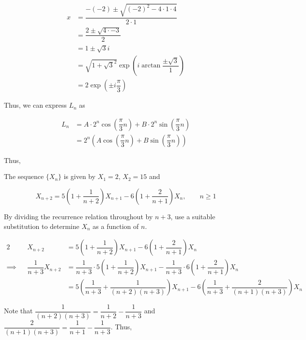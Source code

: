 \documentclass{jhwhw}
\begin{document}
        \begin{align*}
            x &= \dfrac{-(-2) \pm \sqrt{(-2)^2 - 4\cdot1\cdot4}}{2\cdot1}\\
            &= \dfrac{2 \pm \sqrt{4 \cdot -3}}{2}\\
            &= 1 \pm \sqrt{3}i\\
            &= \sqrt{1 + \sqrt{3}^2} \exp{\left(i \arctan{\dfrac{\pm{\sqrt3}}1}\right)}\\
            &= 2 \exp \left(\pm i \dfrac{\pi}3\right)
        \end{align*}

        Thus, we can express $L_n$ as

        \begin{align*}
            L_n &= A \cdot 2^n \cos \left(\dfrac{\pi}3 n\right) + B \cdot 2^n \sin \left(\dfrac{\pi}3 n\right)\\
            &= 2^n \left(A \cos \left(\dfrac{\pi}3 n\right) + B \sin \left(\dfrac{\pi}3 n\right)\right)
        \end{align*}

        Thus,

    \problem{}
        The sequence $\{X_n\}$ is given by $X_1 = 2$, $X_2 = 15$ and

        \begin{equation*}
            X_{n+2} = 5\left(1 + \dfrac1{n+2}\right)X_{n+1} - 6\left(1 + \dfrac2{n+1}\right)X_n, \qquad n \geq 1
        \end{equation*}

        \noindent By dividing the recurrence relation throughout by $n+3$, use a suitable substitution to determine $X_n$ as a function of $n$.

    \solution
        \begin{alignat*}{2}
            &&X_{n+2} &= 5\left(1 + \dfrac1{n+2}\right)X_{n+1} - 6\left(1 + \dfrac2{n+1}\right)X_n\\
            \implies&&\dfrac1{n+3}X_{n+2} &= \dfrac1{n+3} \cdot 5\left(1 + \dfrac1{n+2}\right)X_{n+1} - \dfrac1{n+3} \cdot 6\left(1 + \dfrac2{n+1}\right)X_n\\
            && &= 5\left(\dfrac1{n+3} + \dfrac1{(n+2)(n+3)}\right)X_{n+1} - 6\left(\dfrac1{n+3} + \dfrac2{(n+1)(n+3)}\right)X_n
        \end{alignat*}

        Note that $\dfrac1{(n+2)(n+3)} = \dfrac1{n+2} - \dfrac1{n+3}$ and $\dfrac{2}{(n+1)(n+3)} = \dfrac1{n+1} - \dfrac1{n+3}$. Thus,
\end{document}
